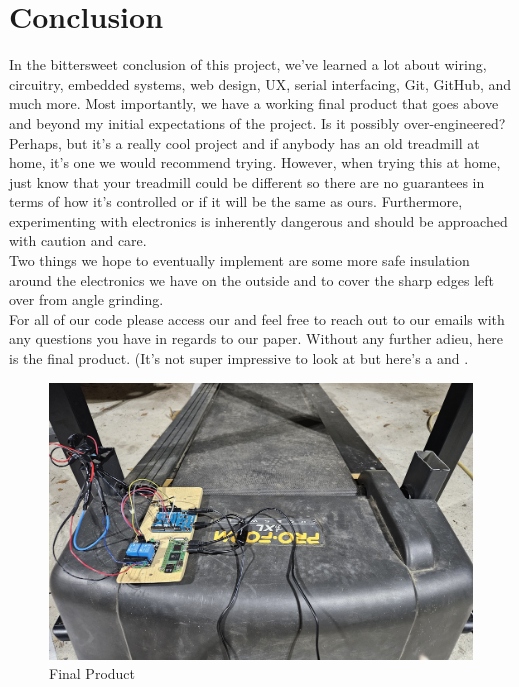 \documentclass[journal]{IEEEtran}
\newcommand{\MYhref}[3][blue]{\href{#2}{\color{#1}{#3}}}%
\begin{document}
\section{Conclusion}
\indent In the bittersweet conclusion of this project, we've learned a lot about wiring, circuitry, embedded systems, web design, UX, serial interfacing, Git, GitHub, and much more. Most importantly, we have a working final product that goes above and beyond my initial expectations of the project. Is it possibly over-engineered? Perhaps, but it's a really cool project and if anybody has an old treadmill at home, it's one we would recommend trying. However, when trying this at home, just know that your treadmill could be different so there are no guarantees in terms of how it's controlled or if it will be the same as ours. Furthermore, experimenting with electronics is inherently dangerous and should be approached with caution and care.\\
\indent Two things we hope to eventually implement are some more safe insulation around the electronics we have on the outside and to cover the sharp edges left over from angle grinding.\\
\indent For all of our code please access our \MYhref{https://github.com/Leo-Berman/Treadmill-To-Walking-Pad.git}{GitHub Repository} and feel free to reach out to our emails with any questions you have in regards to our paper. Without any further adieu, here is the final product. (It's not super impressive to look at but here's a \MYhref{https://drive.google.com/file/d/1rSkrefvcTBKX7KH033j2z0Tslr1Mf0Wk/view?usp=drive_link}{demo video of Leo doing math on the treadmill} and \MYhref{https://drive.google.com/file/d/1RXOLTaLV5otzCxjDomMnXNWlTBuZ_7U1/view?usp=drive_link}{Liam showing off the user interface}.

\pagebreak


\begin{figure} [!h]
\centering
\includegraphics[width=\linewidth]{Final_Product.jpg}
\caption{Final Product}
  \label{Fig: 9l}
\end{figure}
    
\end{document}
